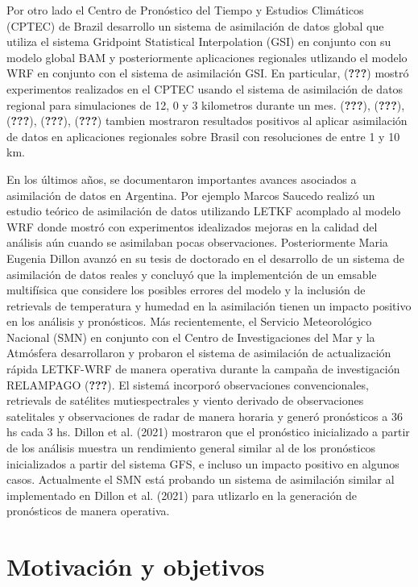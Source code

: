 \documentclass[12pt,twoside]{reedthesis}
\begin{document}
Por otro lado el Centro de Pronóstico del Tiempo y Estudios Climáticos (CPTEC) de Brazil desarrollo un sistema de asimilación de datos global que utiliza el sistema Gridpoint Statistical Interpolation (GSI) en conjunto con su modelo global BAM y posteriormente aplicaciones regionales utlizando el modelo WRF en conjunto con el sistema de asimilación GSI. En particular, ({\textbf{???}}) mostró experimentos realizados en el CPTEC usando el sistema de asimilación de datos regional para simulaciones de 12, 0 y 3 kilometros durante un mes. ({\textbf{???}}), ({\textbf{???}}), ({\textbf{???}}), ({\textbf{???}}), ({\textbf{???}}) tambien mostraron resultados positivos al aplicar asimilación de datos en aplicaciones regionales sobre Brasil con resoluciones de entre 1 y 10 km.

En los últimos años, se documentaron importantes avances asociados a asimilación de datos en Argentina. Por ejemplo Marcos Saucedo realizó un estudio teórico de asimilación de datos utilizando LETKF acomplado al modelo WRF donde mostró con experimentos idealizados mejoras en la calidad del análisis aún cuando se asimilaban pocas observaciones. Posteriormente Maria Eugenia Dillon avanzó en su tesis de doctorado en el desarrollo de un sistema de asimilación de datos reales y concluyó que la implementción de un emsable multifísica que considere los posibles errores del modelo y la inclusión de retrievals de temperatura y humedad en la asimilación tienen un impacto positivo en los análisis y pronósticos. Más recientemente, el Servicio Meteorológico Nacional (SMN) en conjunto con el Centro de Investigaciones del Mar y la Atmósfera desarrollaron y probaron el sistema de asimilación de actualización rápida LETKF-WRF de manera operativa durante la campaña de investigación RELAMPAGO ({\textbf{???}}). El sistemá incorporó observaciones convencionales, retrievals de satélites mutiespectrales y viento derivado de observaciones satelitales y observaciones de radar de manera horaria y generó pronósticos a 36 hs cada 3 hs. Dillon et al. (2021) mostraron que el pronóstico inicializado a partir de los análisis muestra un rendimiento general similar al de los pronósticos inicializados a partir del sistema GFS, e incluso un impacto positivo en algunos casos. Actualmente el SMN está probando un sistema de asimilación similar al implementado en Dillon et al. (2021) para utlizarlo en la generación de pronósticos de manera operativa.

\hypertarget{motivaciuxf3n-y-objetivos}{%
\section{Motivación y objetivos}\label{motivaciuxf3n-y-objetivos}}
\end{document}

